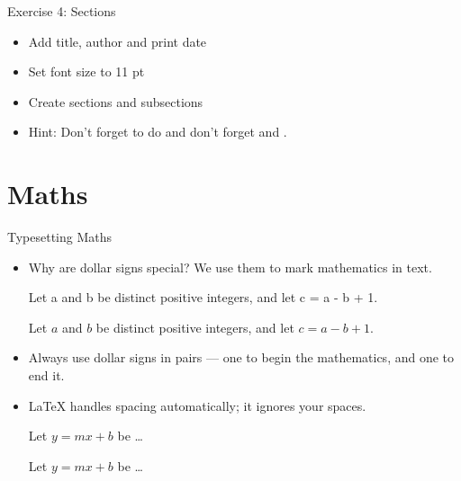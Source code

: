 \documentclass[10pt, notes]{beamer}
\begin{document}
\begin{frame}{Exercise 4: Sections}
\begin{itemize}
\item Add title, author and print date
\item Set font size to 11 pt
\item Create sections and subsections
\end{itemize}
\begin{center}
\end{center}

\begin{itemize}
\item Hint: Don't forget to do  and don't forget 
 and 
.
\end{itemize}

\end{frame}


\section{Maths}
\begin{frame}[fragile]{Typesetting Maths}
\begin{itemize}
\item Why are dollar signs \keys{\$} special? We use them to mark mathematics 
in text.\\[1ex]
\begin{exampletwouptiny}
Let a and b be distinct positive
integers, and let c = a - b + 1.

Let $a$ and $b$ be distinct positive
integers, and let $c = a - b + 1$.
\end{exampletwouptiny}
\item Always use dollar signs in pairs --- one to begin the mathematics, and one
to end it.
\item \LaTeX{} handles spacing automatically; it ignores your spaces.
\begin{exampletwouptiny}
Let $y=mx+b$ be \ldots

Let $y = m x + b$ be \ldots
\end{exampletwouptiny}

\end{itemize}
\end{frame}
\end{document}
